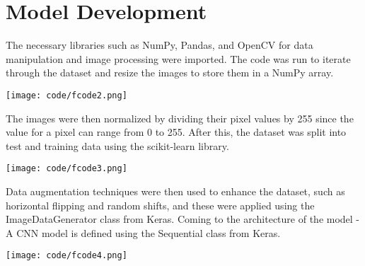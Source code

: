 \documentclass[11pt]{article}
\begin{document}
\section{Model Development}
The necessary libraries such as NumPy, Pandas, and OpenCV \cite{opencv} for data manipulation and image processing were imported. The code was run to iterate through the dataset and resize the images to store them in a NumPy array.
\begin{center}
    \texttt{[image: code/fcode2.png]}
\end{center}
The images were then normalized by dividing their pixel values by 255 since the value for a pixel can range from 0 to 255. After this, the dataset was split into test and training data using the scikit-learn library. \cite{scikitlearn}
\pagebreak
\begin{center}
    \texttt{[image: code/fcode3.png]}
\end{center}



Data augmentation techniques were then used to enhance the dataset, such as horizontal flipping and random shifts, and these were applied using the ImageDataGenerator class from Keras.
Coming to the architecture of the model - A CNN model is defined using the Sequential class from Keras. \cite{keras}
\begin{center}
    \texttt{[image: code/fcode4.png]}
 \end{center}
\end{document}
